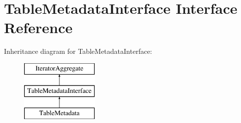\hypertarget{interface_pes_1_1_database_1_1_metadata_1_1_table_metadata_interface}{}\section{Table\+Metadata\+Interface Interface Reference}
\label{interface_pes_1_1_database_1_1_metadata_1_1_table_metadata_interface}
Inheritance diagram for Table\+Metadata\+Interface\+:\begin{figure}[H]
\begin{center}
\leavevmode
\includegraphics[height=3.000000cm]{interface_pes_1_1_database_1_1_metadata_1_1_table_metadata_interface}
\end{center}
\end{figure}
